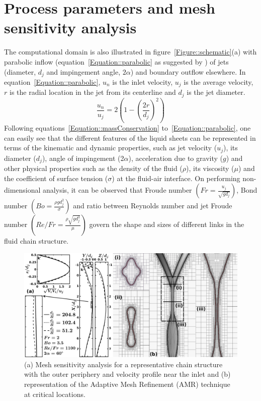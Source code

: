 \section{Process parameters and mesh sensitivity analysis}\label{sec::process}
The computational domain is also illustrated in figure~\ref{Figure::schematic}(a) with parabolic inflow (equation~\ref{Equation::parabolic} as suggested by \cite{choo2007effect}) of jets (diameter, $d_j$ and impingement angle, $2\alpha$) and boundary outflow elsewhere. In equation~\ref{Equation::parabolic}, $u_n$ is the inlet velocity, $u_j$ is the average velocity, $r$ is the radial location in the jet from its centerline and $d_j$ is the jet diameter.
\begin{equation}\label{Equation::parabolic}
\frac{u_n}{u_j} = 2\left(1 - \left(\frac{2r}{d_j}\right)^2\right) 
\end{equation}
Following equations~\ref{Equation::massConservation} to~\ref{Equation::parabolic}, one can easily see that the different features of the liquid sheets can be represented in terms of the kinematic and dynamic properties, such as jet velocity ($u_j$), its diameter ($d_j$), angle of impingement (2$\alpha$), acceleration due to gravity ($g$) and other physical properties such as the density of the fluid ($\rho$), its viscosity ($\mu$) and the coefficient of surface tension ($\sigma$) at the fluid-air interface. On performing non-dimensional analysis, it can be observed that Froude number $\left(Fr = \frac{u_j}{\sqrt{gd_j}}\right)$, Bond number $\left(Bo = \frac{\rho gd_j^2}{\sigma}\right)$ and ratio between Reynolds number and jet Froude number $\left(Re/Fr = \frac{\rho\sqrt{gd_j^3}}{\mu}\right)$ govern the shape and sizes of different links in the fluid chain structure. \\
\begin{figure}
	\centering
	\includegraphics[width=\textwidth]{chapters/Figure2}
	\caption{(a) Mesh sensitivity analysis for a representative chain structure with the outer periphery and velocity profile near the inlet and (b) representation of the Adaptive Mesh Refinement (AMR) technique at critical locations.}
	\label{Figure::gisetal}
\end{figure}
